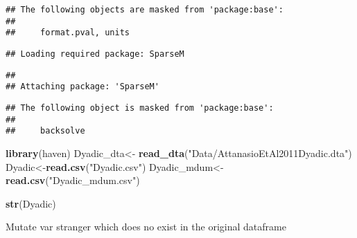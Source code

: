 \documentclass[]{article}
\newenvironment{Shaded}{\begin{snugshade}}{\end{snugshade}}
\newcommand{\KeywordTok}[1]{\textcolor[rgb]{0.13,0.29,0.53}{\textbf{#1}}}
\newcommand{\StringTok}[1]{\textcolor[rgb]{0.31,0.60,0.02}{#1}}
\newcommand{\OperatorTok}[1]{\textcolor[rgb]{0.81,0.36,0.00}{\textbf{#1}}}
\newcommand{\NormalTok}[1]{#1}
\begin{document}
\begin{verbatim}
## The following objects are masked from 'package:base':
## 
##     format.pval, units
\end{verbatim}

\begin{verbatim}
## Loading required package: SparseM
\end{verbatim}

\begin{verbatim}
## 
## Attaching package: 'SparseM'
\end{verbatim}

\begin{verbatim}
## The following object is masked from 'package:base':
## 
##     backsolve
\end{verbatim}

\begin{Shaded}
\begin{Highlighting}[]
\KeywordTok{library}\NormalTok{(haven)}
\NormalTok{Dyadic_dta<-}\StringTok{ }\KeywordTok{read_dta}\NormalTok{(}\StringTok{"Data/AttanasioEtAl2011Dyadic.dta"}\NormalTok{)}
\NormalTok{Dyadic<-}\KeywordTok{read.csv}\NormalTok{(}\StringTok{"Dyadic.csv"}\NormalTok{)}
\NormalTok{Dyadic_mdum<-}\KeywordTok{read.csv}\NormalTok{(}\StringTok{"Dyadic_mdum.csv"}\NormalTok{)}
\end{Highlighting}
\end{Shaded}

\begin{Shaded}
\end{Shaded}

\begin{Shaded}
\begin{Highlighting}[]
\KeywordTok{str}\NormalTok{(Dyadic)}
\end{Highlighting}
\end{Shaded}

Mutate var stranger which does no exist in the original dataframe

\begin{Shaded}
\end{Shaded}
\end{document}
